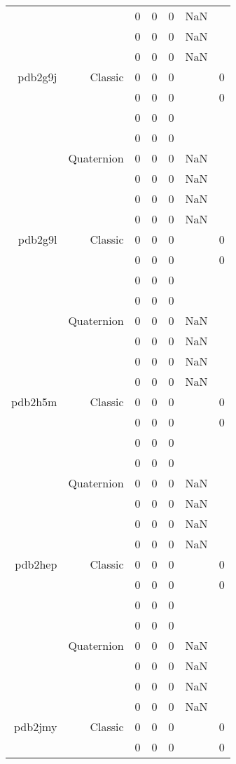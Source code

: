 \begin{xltabular}{\textwidth}{r|rcccSc}
& & 0 & 0 & 0 & NaN & \\
& & 0 & 0 & 0 & NaN & \\
& & 0 & 0 & 0 & NaN & \\ \addlinespace
pdb2g9j & Classic & 0 & 0 & 0 & & 0 \\
& & 0 & 0 & 0 & & 0 \\
& & 0 & 0 & 0 & & \\
& & 0 & 0 & 0 & & \\
& Quaternion & 0 & 0 & 0 & NaN & \\
& & 0 & 0 & 0 & NaN & \\
& & 0 & 0 & 0 & NaN & \\
& & 0 & 0 & 0 & NaN & \\ \addlinespace
pdb2g9l & Classic & 0 & 0 & 0 & & 0 \\
& & 0 & 0 & 0 & & 0 \\
& & 0 & 0 & 0 & & \\
& & 0 & 0 & 0 & & \\
& Quaternion & 0 & 0 & 0 & NaN & \\
& & 0 & 0 & 0 & NaN & \\
& & 0 & 0 & 0 & NaN & \\
& & 0 & 0 & 0 & NaN & \\ \addlinespace
pdb2h5m & Classic & 0 & 0 & 0 & & 0 \\
& & 0 & 0 & 0 & & 0 \\
& & 0 & 0 & 0 & & \\
& & 0 & 0 & 0 & & \\
& Quaternion & 0 & 0 & 0 & NaN & \\
& & 0 & 0 & 0 & NaN & \\
& & 0 & 0 & 0 & NaN & \\
& & 0 & 0 & 0 & NaN & \\ \addlinespace
pdb2hep & Classic & 0 & 0 & 0 & & 0 \\
& & 0 & 0 & 0 & & 0 \\
& & 0 & 0 & 0 & & \\
& & 0 & 0 & 0 & & \\
& Quaternion & 0 & 0 & 0 & NaN & \\
& & 0 & 0 & 0 & NaN & \\
& & 0 & 0 & 0 & NaN & \\
& & 0 & 0 & 0 & NaN & \\ \addlinespace
pdb2jmy & Classic & 0 & 0 & 0 & & 0 \\
& & 0 & 0 & 0 & & 0 \\

\end{xltabular}

